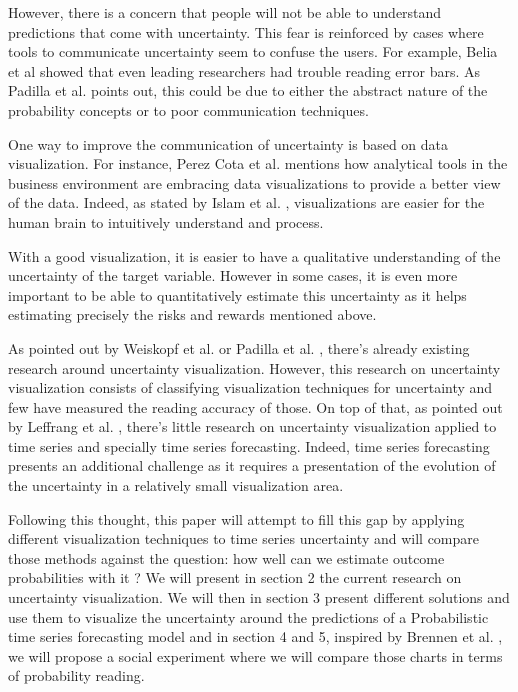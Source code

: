 \documentclass[a4paper,3p,sort&compress]{elsarticle}
\begin{document}
However, there is a concern that people will not be able to understand predictions that come with uncertainty.
This fear is reinforced by cases where tools to communicate uncertainty seem to confuse the users. For example,
Belia et al \cite{belia_researchers_2005} showed that even leading researchers had 
trouble reading error bars. 
As Padilla et al. \cite{padilla_uncertainty_2021} 
points out, this could be due to either the abstract nature of the probability concepts or to poor communication techniques.

One way to improve the communication of uncertainty is based on data visualization. For instance, Perez Cota et al. 
\cite{cota_importance_2014} mentions how analytical tools in the business 
environment are embracing data visualizations to provide a better view of the data. Indeed, as 
stated by Islam et al. \cite{islam_overview_2019}, visualizations are easier for the human brain to intuitively understand and process.

With a good visualization, it is easier to have a qualitative understanding of the uncertainty of the target variable. 
However in some cases, it is even more important to be able to quantitatively estimate this uncertainty as it helps estimating precisely 
the risks and rewards mentioned above. 

As pointed out by Weiskopf et al. \cite{weiskopf_uncertainty_2022} or Padilla et al. \cite{padilla_uncertainty_2021}, 
there's already existing research around uncertainty visualization. However, this research on uncertainty visualization consists of 
classifying visualization techniques for uncertainty and few have measured the reading accuracy of those.
On top of that, as pointed out by Leffrang et al. \cite{leffrang_should_2021}, 
there's little research on uncertainty visualization applied to time series 
and specially time series forecasting. Indeed, time series forecasting presents an additional challenge as it requires a presentation of 
the evolution of the uncertainty in a relatively small visualization area.

Following this thought, this paper will attempt to fill this gap by applying different visualization techniques 
to time series uncertainty and will compare those methods against the question: how well can we estimate outcome probabilities with it ? 
We will present in section 2 the current research on uncertainty 
visualization. We will then in section 3
present different solutions and use them to visualize the uncertainty around the predictions 
of a Probabilistic time series forecasting model and in section 4 and 5,
inspired by Brennen et al. \cite{brennen_instrument_2018}, we will propose a 
social experiment where we will compare those charts in terms of probability reading. 
\end{document}
